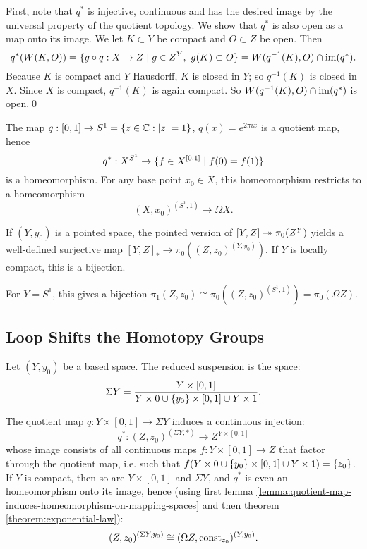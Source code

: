 

First, note that $q^*$ is injective, continuous and has the desired image by the universal property of the quotient topology. We show that $q^*$ is also open as a map onto its image. We let $K\subset Y$ be compact and $O\subset Z$ be open. Then
\[q^*(W(K,O))=\{g\circ q:X\to Z\mid g\in Z^Y,\ g(K)\subset O\}=W(q^{-1}(K),O)\cap\operatorname{im}(q^*).\]
Because $K$ is compact and $Y$ Hausdorff, $K$ is closed in $Y$; so $q^{-1}(K)$ is closed in $X$. Since $X$ is compact, $q^{-1}(K)$ is again compact. So $W(q^{-1}(K),O)\cap\operatorname{im}(q^*)$ is open.\qed

\begin{example}
The map $q:[0,1]\to S^1=\{z\in\mathbb{C}:|z|=1\}$, $q(x)=e^{2\pi ix}$ is a quotient map, hence
\[q^*:X^{S^1}\to\{f\in X^{[0,1]}\mid f(0)=f(1)\}\]
is a homeomorphism. For any base point $x_0\in X$, this homeomorphism restricts to a homeomorphism
\[(X,x_0)^{(S^1,1)}\to\Omega X.\]

If $(Y,y_0)$ is a pointed space, the pointed version of $[Y,Z]\twoheadrightarrow\pi_0(Z^Y)$ yields a well-defined surjective map $[Y,Z]_*\to\pi_0((Z,z_0)^{(Y,y_0)})$. If $Y$ is locally compact, this is a bijection.

For $Y=S^1$, this gives a bijection $\pi_1(Z,z_0)\cong\pi_0((Z,z_0)^{(S^1,1)})=\pi_0(\Omega Z)$.
\end{example}

\subsection{Loop Shifts the Homotopy Groups}

Let $(Y,y_0)$ be a based space. The reduced suspension is the space:
\[\Sigma Y=\frac{Y\times[0,1]}{Y\times 0\cup\{y_0\}\times[0,1]\cup Y\times 1}.\]

The quotient map $q:Y\times[0,1]\to\Sigma Y$ induces a continuous injection:
\[q^*:(Z,z_0)^{(\Sigma Y,*)}\to Z^{Y\times[0,1]}\]
whose image consists of all continuous maps $f:Y\times[0,1]\to Z$ that factor through the quotient map, i.e. such that $f(Y\times 0\cup\{y_0\}\times[0,1]\cup Y\times 1)=\{z_0\}$. If $Y$ is compact, then so are $Y\times[0,1]$ and $\Sigma Y$, and $q^*$ is even an homeomorphism onto its image, hence (using first lemma \ref{lemma:quotient-map-induces-homeomorphism-on-mapping-spaces} and then theorem \ref{theorem:exponential-law}):
\[(Z,z_0)^{(\Sigma Y,y_0)}\cong(\Omega Z,\operatorname{const}_{z_0})^{(Y,y_0)}.\]


